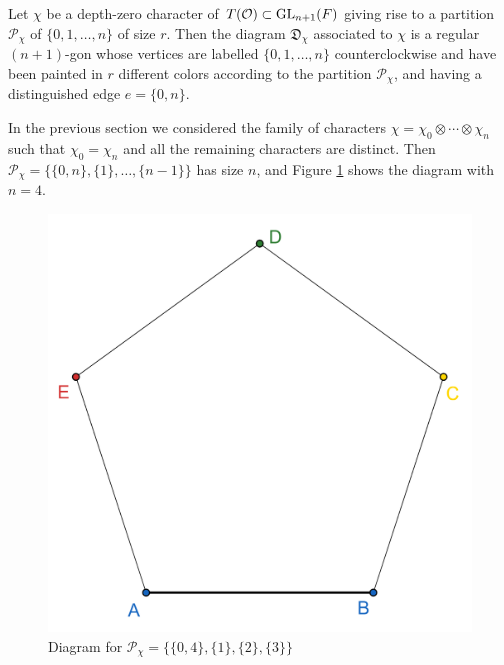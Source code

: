 
    \begin{definition}
        Let $\chi$ be a depth-zero character of $T(\mathcal{O})\subset\mathrm{GL}_{n+1}(F)$ giving rise to a partition $\mathcal{P}_\chi$ of $\{0,1,\ldots,n\}$ of size $r$. Then the diagram $\mathfrak{D}_\chi$ associated to $\chi$ is a regular $(n+1)$-gon whose vertices are labelled $\{0,1,\ldots,n\}$ counterclockwise and have been painted in $r$ different colors according to the partition $\mathcal{P}_\chi$, and having a distinguished edge $e=\{0,n\}$.
    \end{definition}


    \begin{example}
        In the previous section we considered the family of characters $\chi=\chi_0\otimes\cdots\otimes\chi_n$ such that $\chi_0=\chi_n$ and all the remaining characters are distinct. Then $\mathcal{P}_\chi=\{\{0,n\},\{1\},\ldots,\{n-1\}\}$ has size $n$, and Figure \ref{fig_diagn4} shows the diagram with $n=4$.
        \begin{figure}[ht]
            \begin{center}
                \includegraphics[scale=0.8]{geogebra-export.png}
                \caption{Diagram for $\mathcal{P}_\chi=\{\{0,4\},\{1\},\{2\},\{3\}\}$}
                \label{fig_diagn4}
            \end{center}
        \end{figure}
    \end{example}


